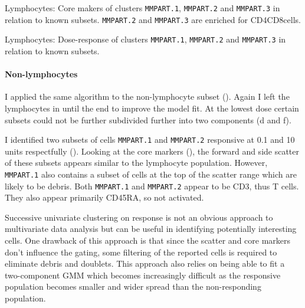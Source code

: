 %
{ Lymphocytes: Core makers of clusters \texttt{MMPART.1}, \texttt{MMPART.2} and \texttt{MMPART.3} in relation to known subsets. }
{ 
    \texttt{MMPART.2} and \texttt{MMPART.3} are enriched for CD4\negative CD8\positive cells.
}

%
{ Lymphocytes: Dose-response of clusters \texttt{MMPART.1}, \texttt{MMPART.2} and \texttt{MMPART.3} in relation to known subsets. }
{ }

\clearpage


\paragraph{Non-lymphocytes}

I applied the same algorithm to the non-lymphocyte subset ().
Again I left the lymphocytes in until the end to improve the model fit.
At the lowest dose certain subsets could not be further subdivided further into two components (d and f).

I identified two subsets of cells \texttt{MMPART.1} and \texttt{MMPART.2} responsive at 0.1 and 10 units respectfully ().
Looking at the core markers (), the forward and side scatter of these subsets appears similar to the lymphocyte population.
However, \texttt{MMPART.1} also contains a subset of cells at the top of the scatter range which are likely to be debris.
Both \texttt{MMPART.1} and \texttt{MMPART.2} appear to be CD3\positive, thus T cells.
They also appear primarily CD45RA\negative, so not activated.

Successive univariate clustering on response is not an obvious approach to multivariate data analysis but can be useful in identifying potentially interesting cells.
One drawback of this approach is that since the scatter and core markers don't influence the gating, some filtering of the reported cells is required to eliminate
debris and doublets.
This approach also relies on being able to fit a two-component \gls{GMM} which becomes increasingly difficult as the responsive population becomes smaller and wider
spread than the non-responding population.

